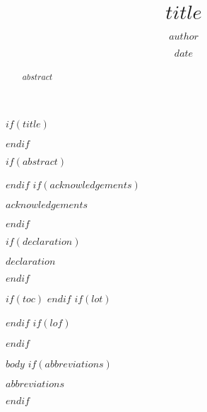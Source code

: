 \documentclass[11pt,twoside, openany]{rhodesthesis}
\title{$title$}
\author{$author$}
\date{$date$}
\begin{document}
$if(title)$
  \maketitle
$endif$

\frontmatter %
\pagestyle{empty} %
$if(abstract)$
  \begin{abstract}
    $abstract$
  \end{abstract}
$endif$
$if(acknowledgements)$
  \begin{acknowledgements}
    $acknowledgements$
  \end{acknowledgements}
$endif$

$if(declaration)$
  \begin{declaration}
    $declaration$
  \end{declaration}
$endif$

$if(toc)$
  \hypersetup{linkcolor=$if(toccolor)$$toccolor$$else$black$endif$}
  \setcounter{tocdepth}{$toc-depth$}
  \tableofcontents
$endif$
$if(lot)$
  \listoftables
$endif$
$if(lof)$
  \listoffigures
$endif$

\mainmatter %
\pagestyle{plain}
$body$
$if(abbreviations)$
  \begin{abbreviations}
    $abbreviations$
  \end{abbreviations}
$endif$
\end{document}
